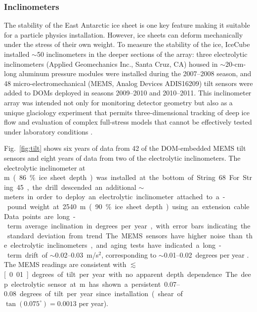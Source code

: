 \subsubsection{Inclinometers}

The stability of the East Antarctic ice sheet is one key feature making it
suitable for a particle physics installation.  However, ice sheets can
deform mechanically under the stress of their own weight.  To measure the
stability of the ice, IceCube installed $\sim$50
inclinometers in the deeper sections of the array: three 
electrolytic inclinometers (Applied Geomechanics Inc., Santa Cruz, CA)
housed in $\sim$20-cm-long aluminum pressure modules were installed during
the 2007--2008 season, and 48 micro-electromechanical (MEMS, Analog Devices
ADIS16209) tilt sensors were added to DOMs deployed in seasons 2009--2010 and
2010--2011.  This inclinometer array was intended not only for monitoring
detector geometry but also as a unique glaciology experiment that
permits three-dimensional tracking of deep ice flow and evaluation of complex
full-stress models that cannot be effectively tested under laboratory
conditions \cite{pattyn03}.

Fig.~\ref{fig:tilt} shows
six years of data from 42 of the DOM-embedded MEMS tilt sensors and
eight years of data from two of the electrolytic inclinometers. The electrolytic inclinometer at \unit[2455]m (86\% ice sheet depth) was
installed at the bottom of String 68.  For String 45, the drill
descended an additional $\sim$\unit[100]meters in order to deploy an
electrolytic inclinometer attached to a \unit[100]-pound weight at 2540 m
(90\% ice sheet depth) using an extension cable. Data
points are long-term average inclination in degrees per year, with error
bars indicating the standard deviation from trend.  The MEMS sensors have
higher noise than the electrolytic inclinometers, and aging tests have indicated a long-term
drift of $\sim$\numrange[range-phrase = --]{0.02}{0.03}~m/s$^2$, corresponding to
$\sim$\numrange[range-phrase = --]{0.01}{0.02}~degrees per year
\cite{inclinometer_comm}. The MEMS readings are consistent with
$\lesssim$\unit[0.01]degrees of tilt per year with no apparent depth
dependence.  The deep electrolytic sensor 
at \unit[2540]m has shown a persistent \numrange[range-phrase =
  --]{0.07}{0.08} degrees of tilt per year since installation (shear
  of $\tan(0.075^\circ) = 0.0013$
per year).

